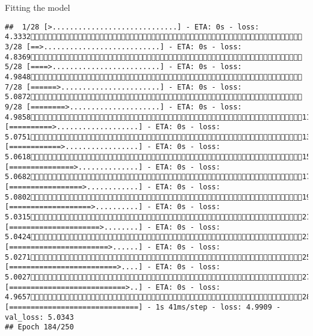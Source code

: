 \documentclass[
  ignorenonframetext,
]{beamer}
\begin{document}
\begin{frame}[fragile]{Fitting the model}
\begin{verbatim}
##  1/28 [>.............................] - ETA: 0s - loss: 4.3332 3/28 [==>...........................] - ETA: 0s - loss: 4.8369 5/28 [====>.........................] - ETA: 0s - loss: 4.9848 7/28 [======>.......................] - ETA: 0s - loss: 5.0872 9/28 [========>.....................] - ETA: 0s - loss: 4.985811/28 [==========>...................] - ETA: 0s - loss: 5.075113/28 [============>.................] - ETA: 0s - loss: 5.061815/28 [===============>..............] - ETA: 0s - loss: 5.068217/28 [=================>............] - ETA: 0s - loss: 5.080219/28 [===================>..........] - ETA: 0s - loss: 5.031521/28 [=====================>........] - ETA: 0s - loss: 5.042423/28 [=======================>......] - ETA: 0s - loss: 5.027125/28 [=========================>....] - ETA: 0s - loss: 5.002727/28 [===========================>..] - ETA: 0s - loss: 4.965728/28 [==============================] - 1s 41ms/step - loss: 4.9909 - val_loss: 5.0343
## Epoch 184/250

\end{verbatim}
\end{frame}
\end{document}
